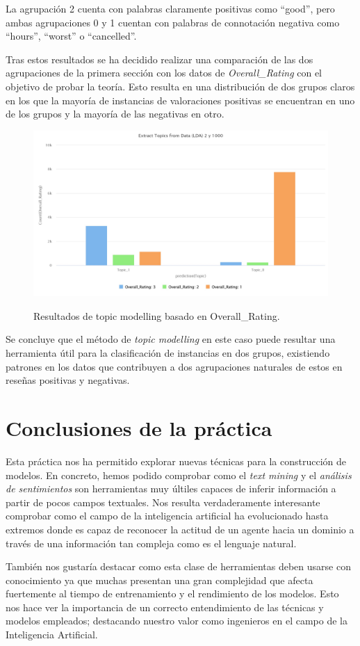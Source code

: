 \documentclass[es]{uc3mreport}
\begin{document}
\begin{report}
La agrupación 2 cuenta con palabras claramente positivas como ``good'', pero
ambas agrupaciones 0 y 1 cuentan con palabras de connotación negativa como
``hours'', ``worst'' o ``cancelled''.

Tras estos resultados se ha decidido realizar una comparación de las dos
agrupaciones de la primera sección con los datos de \textit{Overall\_Rating} con el
objetivo de probar la teoría. Esto resulta en una distribución de dos grupos
claros en los que la mayoría de instancias de valoraciones positivas se
encuentran en uno de los grupos y la mayoría de las negativas en otro.

\begin{figure}
    \center
    \includegraphics[width=0.85\linewidth]{graph_2topic_1000iter_rating.jpeg}\\
    \caption{Resultados de topic modelling basado en Overall\_Rating.}
\end{figure}

Se concluye que el método de \textit{topic modelling} en este caso puede resultar una
herramienta útil para la clasificación de instancias en dos grupos, existiendo
patrones en los datos que contribuyen a dos agrupaciones naturales de estos en
reseñas positivas y negativas.

\section{Conclusiones de la práctica}
\label{chap:conclusion}

Esta práctica nos ha permitido explorar nuevas técnicas para la construcción de
modelos. En concreto, hemos podido comprobar como el \textit{text mining} y el
\textit{análisis de sentimientos} son herramientas muy últiles capaces de
inferir información a partir de pocos campos textuales. Nos resulta
verdaderamente interesante comprobar como el campo de la inteligencia
artificial ha evolucionado hasta extremos donde es capaz de reconocer la
actitud de un agente hacia un dominio a través de una información tan compleja
como es el lenguaje natural.

También nos gustaría destacar como esta clase de herramientas deben usarse con
conocimiento ya que muchas presentan una gran complejidad que afecta
fuertemente al tiempo de entrenamiento y el rendimiento de los modelos. Esto
nos hace ver la importancia de un correcto entendimiento de las técnicas y
modelos empleados; destacando nuestro valor como ingenieros en el campo de la
Inteligencia Artificial.

  \end{report}
\end{document}
